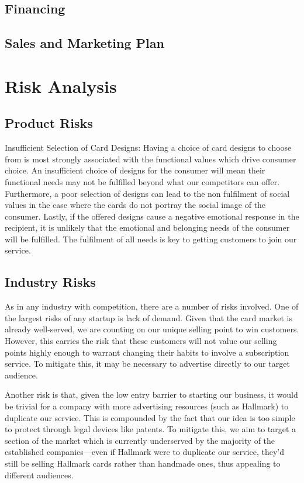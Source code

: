 \documentclass[10pt, a4paper]{article}
\begin{document}
\subsection*{Financing}

\subsection*{Sales and Marketing Plan}

\section*{Risk Analysis}
\subsection*{Product Risks}
Insufficient Selection of Card Designs: Having a choice of card designs to choose from is most strongly associated with the functional values which drive consumer choice. An insufficient choice of designs for the consumer will mean their functional needs may not be fulfilled beyond what our competitors can offer. Furthermore, a poor selection of designs can lead to the non fulfilment of social values in the case where the cards do not portray the social image of the consumer. Lastly, if the offered designs cause a negative emotional response in the recipient, it is unlikely that the emotional and belonging needs of the consumer will be fulfilled. The fulfilment of all needs is key to getting customers to join our service.

\subsection*{Industry Risks}
As in any industry with competition, there are a number of risks involved. One of the largest risks of any startup is lack of demand. Given that the card market is already well-served, we are counting on our unique selling point to win customers. However, this carries the risk that these customers will not value our selling points highly enough to warrant changing their habits to involve a subscription service. To mitigate this, it may be necessary to advertise directly to our target audience.

Another risk is that, given the low entry barrier to starting our business, it would be trivial for a company with more advertising resources (such as Hallmark) to duplicate our service. This is compounded by the fact that our idea is too simple to protect through legal devices like patents. To mitigate this, we aim to target a section of the market which is currently underserved by the majority of the established companies---even if Hallmark were to duplicate our service, they'd still be selling Hallmark cards rather than handmade ones, thus appealing to different audiences.
\end{document}
